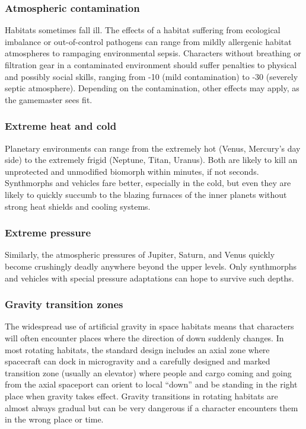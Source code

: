 \subsubsection{Atmospheric contamination}

Habitats sometimes fall ill. The effects of a habitat suffering from ecological imbalance or out-of-control pathogens can range from mildly allergenic habitat atmospheres to rampaging environmental sepsis. Characters without breathing or filtration gear in a contaminated environment should suffer penalties to physical and possibly social skills, ranging from -10 (mild contamination) to -30 (severely septic atmosphere). Depending on the contamination, other effects may apply, as the gamemaster sees fit.

\subsubsection{Extreme heat and cold}

Planetary environments can range from the extremely hot (Venus, Mercury’s day side) to the extremely frigid (Neptune, Titan, Uranus). Both are likely to kill an unprotected and unmodified biomorph within minutes, if not seconds. Synthmorphs and vehicles fare better, especially in the cold, but even they are likely to quickly succumb to the blazing furnaces of the inner planets without strong heat shields and cooling systems.

\subsubsection{Extreme pressure}

Similarly, the atmospheric pressures of Jupiter, Saturn, and Venus quickly become crushingly deadly anywhere beyond the upper levels. Only synthmorphs and vehicles with special pressure adaptations can hope to survive such depths.

\subsubsection{Gravity transition zones}

The widespread use of artificial gravity in space habitats means that characters will often encounter places where the direction of down suddenly changes. In most rotating habitats, the standard design includes an axial zone where spacecraft can dock in microgravity and a carefully designed and marked transition zone (usually an elevator) where people and cargo coming and going from the axial spaceport can orient to local ``down'' and be standing in the right place when gravity takes effect. Gravity transitions in rotating habitats are almost always gradual but can be very dangerous if a character encounters them in the wrong place or time.

